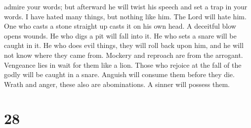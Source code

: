 admire your words; but afterward he will twist his speech and set a trap
in your words.  I have hated many things, but nothing like
him. The Lord will hate him.  One who casts a stone
straight up casts it on his own head. A deceitful blow opens wounds.
 He who digs a pit will fall into it. He who sets a snare
will be caught in it.  He who does evil things, they will
roll back upon him, and he will not know where they came from.
 Mockery and reproach are from the arrogant. Vengeance lies
in wait for them like a lion.  Those who rejoice at the
fall of the godly will be caught in a snare. Anguish will consume them
before they die.  Wrath and anger, these also are
abominations. A sinner will possess them.

\hypertarget{section-24}{%
\section{28}\label{section-24}}

